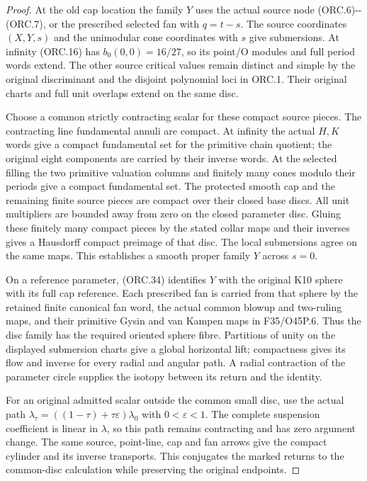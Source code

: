 \begin{proof}
At the old cap location the family \(Y\) uses the actual
source node (ORC.6)-\/-(ORC.7), or the prescribed selected
fan with \(q=t-s\). The source coordinates \((X,Y,s)\)
and the unimodular cone coordinates with \(s\) give
submersions. At infinity (ORC.16) has
\(b_0(0,0)=16/27\), so its point/O modules and full
period words extend. The other source critical values
remain distinct and simple by the original discriminant
and the disjoint polynomial loci in ORC.1. Their original
charts and full unit overlaps extend on the same disc.

Choose a common strictly contracting scalar for these
compact source pieces. The contracting line fundamental
annuli are compact. At infinity the actual \(H,K\) words
give a compact fundamental set for the primitive chain
quotient; the original eight components are carried by
their inverse words. At the selected filling the two
primitive valuation columns and finitely many cones
modulo their periods give a compact fundamental set.
The protected smooth cap and the remaining finite
source pieces are compact over their closed base discs.
All unit multipliers are bounded away from zero on
the closed parameter disc. Gluing these finitely many
compact pieces by the stated collar maps and their
inverses gives a Hausdorff compact preimage of that disc.
The local submersions agree on the same maps. This
establishes a smooth proper family \(Y\) across \(s=0\).

On a reference parameter, (ORC.34) identifies \(Y\)
with the original K10 sphere with its full cap reference.
Each prescribed fan is carried from that sphere by the
retained finite canonical fan word, the actual common
blowup and two-ruling maps, and their primitive Gysin
and van Kampen maps in F35/O45P.6. Thus the disc
family has the required oriented sphere fibre.
Partitions of unity on the displayed submersion charts
give a global horizontal lift; compactness gives its
flow and inverse for every radial and angular path.
A radial contraction of the parameter circle supplies
the isotopy between its return and the identity.

For an original admitted scalar outside the common
small disc, use the actual path
\(\lambda_\tau=((1-\tau)+\tau\varepsilon)\lambda_0\)
with \(0<\varepsilon<1\). The complete suspension
coefficient is linear in \(\lambda\), so this path
remains contracting and has zero argument change.
The same source, point-line, cap and fan arrows give
the compact cylinder and its inverse transports.
This conjugates the marked returns to the common-disc
calculation while preserving the original endpoints.


\end{proof}
